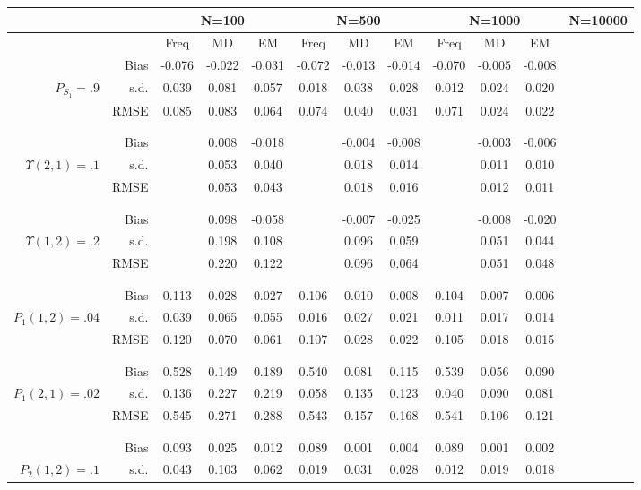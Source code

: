\begin{tabular}{rr@{\hskip .3in}ccc@{\hskip .4in}ccc@{\hskip .4in}ccc}
\hline
& &  \multicolumn{3}{c}{N=100}&\multicolumn{3}{c}{N=500}&\multicolumn{3}{c}{N=1000}&\multicolumn{3}{c}{N=10000} \\
\hline
&   &Freq & MD & EM &Freq & MD & EM &Freq & MD & EM \\
\hline
&Bias & -0.076&-0.022&-0.031&-0.072&-0.013&-0.014&-0.070&-0.005&-0.008 \\
$ P_{S_{1}}=.9 $& s.d. & 0.039&0.081&0.057&0.018&0.038&0.028&0.012&0.024&0.020 \\
&RMSE & 0.085&0.083&0.064&0.074&0.040&0.031&0.071&0.024&0.022 \\
\\\\&Bias & &0.008&-0.018&&-0.004&-0.008&&-0.003&-0.006 \\
$ \Upsilon(2,1)=.1 $& s.d. & &0.053&0.040&&0.018&0.014&&0.011&0.010 \\
&RMSE & &0.053&0.043&&0.018&0.016&&0.012&0.011 \\
\\\\&Bias & &0.098&-0.058&&-0.007&-0.025&&-0.008&-0.020 \\
$ \Upsilon(1,2)=.2 $& s.d. & &0.198&0.108&&0.096&0.059&&0.051&0.044 \\
&RMSE & &0.220&0.122&&0.096&0.064&&0.051&0.048 \\
\\\\&Bias & 0.113&0.028&0.027&0.106&0.010&0.008&0.104&0.007&0.006 \\
$ P_{1}(1,2)=.04 $& s.d. & 0.039&0.065&0.055&0.016&0.027&0.021&0.011&0.017&0.014 \\
&RMSE & 0.120&0.070&0.061&0.107&0.028&0.022&0.105&0.018&0.015 \\
\\\\&Bias & 0.528&0.149&0.189&0.540&0.081&0.115&0.539&0.056&0.090 \\
$ P_{1}(2,1)=.02 $& s.d. & 0.136&0.227&0.219&0.058&0.135&0.123&0.040&0.090&0.081 \\
&RMSE & 0.545&0.271&0.288&0.543&0.157&0.168&0.541&0.106&0.121 \\
\\\\&Bias & 0.093&0.025&0.012&0.089&0.001&0.004&0.089&0.001&0.002 \\
$ P_{2}(1,2)=.1 $& s.d. & 0.043&0.103&0.062&0.019&0.031&0.028&0.012&0.019&0.018 \\

\end{tabular}

